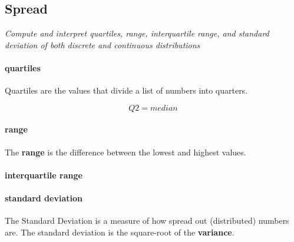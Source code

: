 \subsection[spread]{Spread}

\textit{Compute and interpret quartiles, range, interquartile range, and standard deviation of both discrete and continuous distributions}
    
\vspace{.5cm}

\paragraph*{quartiles}

Quartiles are the values that divide a list of numbers into quarters.

$$ Q2 = median $$

\paragraph*{range}

The \textbf{range} is the difference between the lowest and highest values.

\paragraph*{interquartile range}

\paragraph*{standard deviation}

The Standard Deviation is a measure of how spread out (distributed) numbers are. The standard deviation is the square-root of the \textbf{variance}.